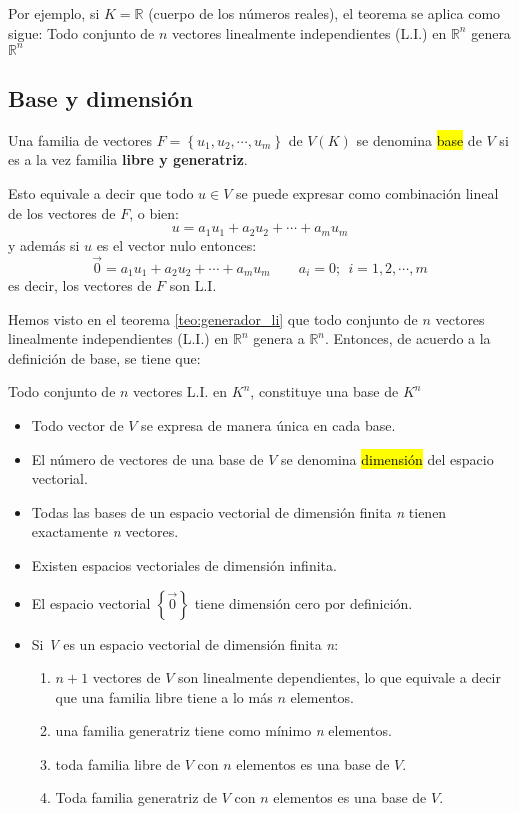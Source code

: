 Por ejemplo, si \(K=\mathbb{R}\) (cuerpo de los números reales), el teorema se aplica como sigue: Todo conjunto de \(n\) vectores linealmente independientes (L.I.) en \(\mathbb{R}^n\) genera \(\mathbb{R}^n\)

\subsection{Base y dimensión}

Una familia de vectores \(F = \left\{u_1, u_2, \cdots, u_m\right\}\) de \(V(K)\) se denomina \hl{base} de \(V\) si es a la vez familia \textbf{libre y generatriz}.

Esto equivale a decir que todo \(u \in V\) se puede expresar como combinación lineal de los vectores de \(F\), o bien:
\[
  u = a_1 u_1 + a_2 u _2 + \cdots + a_m u_m
\] 
y además si \(u\) es el vector nulo entonces:
\[
  \vec{0} = a_1 u_1 + a_2 u_2 + \cdots + a_m u_m \qquad a_i = 0; ~~ i=1,2,\cdots,m
\]
es decir, los vectores de \(F\) son L.I.

Hemos visto en el teorema \ref{teo:generador_li} que todo conjunto de \(n\) vectores linealmente independientes (L.I.) en \(\mathbb{R}^n\) genera a \(\mathbb{R}^n\). Entonces, de acuerdo a la definición de base, se tiene que:
\begin{tcolorbox}
  \centering
  Todo conjunto de \(n\) vectores L.I. en \(K^n\), constituye una base de \(K^n\)
\end{tcolorbox}

\begin{itemize}
  \item Todo vector de \(V\) se expresa de manera única en cada base.
  \item El número de vectores de una base de \(V\) se denomina \hl{dimensión} del espacio vectorial.
  \item Todas las bases de un espacio vectorial de dimensión finita \textit{n} tienen exactamente \textit{n} vectores.
  \item Existen espacios vectoriales de dimensión infinita.
  \item El espacio vectorial \(\left\{\vec{0}\right\}\) tiene dimensión cero por definición.
  \item Si \textit{V} es un espacio vectorial de dimensión finita \textit{n}:
  \begin{enumerate}
    \item \(n+1\) vectores de \(V\) son linealmente dependientes, lo que equivale a decir que una familia libre tiene a lo más \(n\) elementos.
    \item una familia generatriz tiene como mínimo \textit{n} elementos.
    \item toda familia libre de \(V\) con \(n\) elementos es una base de \(V\).
    \item Toda familia generatriz de \(V\) con \(n\) elementos es una base de \(V\).
  \end{enumerate}
\end{itemize}

